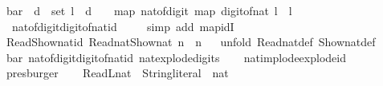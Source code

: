 \begin{isabellebody}
\ bar{\isacharprime}{\kern0pt}{\isacharcolon}{\kern0pt}\ {\isacartoucheopen}{\isasymforall}\ d\ {\isasymin}\ set\ l\ {\isachardot}{\kern0pt}\ d\ {\isacharless}{\kern0pt}\ {}{}\ {\isasymLongrightarrow}\ map\ nat{\isacharunderscore}{\kern0pt}of{\isacharunderscore}{\kern0pt}digit\ {\isacharparenleft}{\kern0pt}map\ digit{\isacharunderscore}{\kern0pt}of{\isacharunderscore}{\kern0pt}nat\ l{\isacharparenright}{\kern0pt}\ {\isacharequal}{\kern0pt}\ l{\isacartoucheclose}\isanewline
%
\isadelimproof
\ \ %
\endisadelimproof
%
\isatagproof
{}\isamarkupfalse%
\ \ nat{\isacharunderscore}{\kern0pt}of{\isacharunderscore}{\kern0pt}digit{\isacharunderscore}{\kern0pt}digit{\isacharunderscore}{\kern0pt}of{\isacharunderscore}{\kern0pt}nat{\isacharunderscore}{\kern0pt}id\ \isanewline
\ \ \isamarkupfalse%
\ {\isacharparenleft}{\kern0pt}simp\ add{\isacharcolon}{\kern0pt}\ map{\isacharunderscore}{\kern0pt}idI{\isacharparenright}{\kern0pt}%
\endisatagproof
{\isafoldproof}%
%
\isadelimproof
\isanewline
%
\endisadelimproof
\isanewline
{}\isamarkupfalse%
\ Read{\isacharunderscore}{\kern0pt}Show{\isacharunderscore}{\kern0pt}nat{\isacharunderscore}{\kern0pt}id{\isacharcolon}{\kern0pt}\ {\isacartoucheopen}Read\isactrlsub n\isactrlsub a\isactrlsub t{\isacharparenleft}{\kern0pt}Show\isactrlsub n\isactrlsub a\isactrlsub t\ n{\isacharparenright}{\kern0pt}\ {\isacharequal}{\kern0pt}\ n{\isacartoucheclose}\isanewline
%
\isadelimproof
\ \ %
\endisadelimproof
%
\isatagproof
{}\isamarkupfalse%
{\isacharparenleft}{\kern0pt}unfold\ Read\isactrlsub n\isactrlsub a\isactrlsub t{\isacharunderscore}{\kern0pt}def\ Show\isactrlsub n\isactrlsub a\isactrlsub t{\isacharunderscore}{\kern0pt}def{\isacharparenright}{\kern0pt}\isanewline
\ \ \isamarkupfalse%
\ bar{\isacharprime}{\kern0pt}\ nat{\isacharunderscore}{\kern0pt}of{\isacharunderscore}{\kern0pt}digit{\isacharunderscore}{\kern0pt}digit{\isacharunderscore}{\kern0pt}of{\isacharunderscore}{\kern0pt}nat{\isacharunderscore}{\kern0pt}id\ nat{\isacharunderscore}{\kern0pt}explode{\isacharunderscore}{\kern0pt}digits\isanewline
\ \ \isamarkupfalse%
\ nat{\isacharunderscore}{\kern0pt}implode{\isacharunderscore}{\kern0pt}explode{\isacharunderscore}{\kern0pt}id\ \isanewline
\ \ \isamarkupfalse%
\ presburger%
\endisatagproof
{\isafoldproof}%
%
\isadelimproof
\isanewline
%
\endisadelimproof
\isanewline
{}\isamarkupfalse%
\ \isanewline
\ \ ReadL\isactrlsub n\isactrlsub a\isactrlsub t\ {\isacharcolon}{\kern0pt}{\isacharcolon}{\kern0pt}\ {\isacartoucheopen}String{\isachardot}{\kern0pt}literal\ {\isasymRightarrow}\ nat{\isacartoucheclose}\ {\isacharparenleft}{\kern0pt}{\isacartoucheopen}{\isasymlceil}{\isacharunderscore}{\kern0pt}{\isasymrceil}{\isacartoucheclose}{\isacharparenright}{\kern0pt}\ \ \isanewline

\end{isabellebody}
